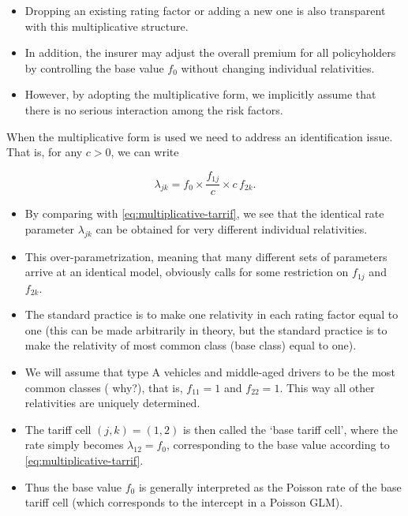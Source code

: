 \documentclass[ignorenonframetext,]{beamer}
\begin{document}
\begin{frame}[allowframebreaks]
\begin{itemize}
\framebreak

\item Dropping an existing rating factor or adding a new one is also transparent with this multiplicative structure. 
\item In addition, the insurer may adjust the overall premium for all policyholders by controlling the base value $f_0$ without changing individual relativities. \item However, by adopting the multiplicative form, we implicitly assume that there is no serious interaction among the risk factors.  
\end{itemize}

\framebreak

When the multiplicative form is used we need to address an identification issue. That is, for any $c>0$, we can write 

$$
\lambda_{jk}= f_0 \times \frac{f_{1j}}{c} \times c\,f_{2k}. 
$$
\begin{itemize}
\item By comparing with \eqref{eq:multiplicative-tarrif}, we see that the identical rate parameter $\lambda_{jk}$ can be obtained for very different individual relativities.
\item  This over-parametrization, meaning that many different sets of parameters arrive at an identical model, obviously calls for some restriction on $f_{1j}$ and $f_{2k}$. 
\item The standard practice is to make one relativity in each rating factor equal to one (this can be made arbitrarily in theory, but the standard practice is to make the relativity of most common class (base class) equal to one).


\framebreak

\item We will assume that type A vehicles and middle-aged drivers to  be the most common classes ({\color{red} why?}), that is, $f_{11} = 1$ and $f_{22} = 1$.  This way all other relativities are uniquely determined. 
\item The tariff cell $(j,k)=(1,2)$ is then called the `base tariff cell', where the rate simply becomes $\lambda_{12}=f_0$, corresponding to the base value according to \eqref{eq:multiplicative-tarrif}. 
\item Thus the base value $f_0$ is generally interpreted as the Poisson rate of the base tariff cell (which corresponds to the intercept in a Poisson GLM).  


\framebreak


\end{itemize}
\end{frame}
\end{document}
